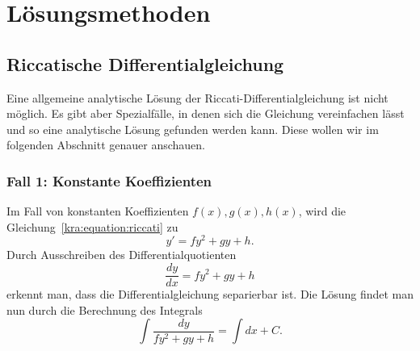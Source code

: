 \section{Lösungsmethoden} \label{kra:section:loesung}

\subsection{Riccatische Differentialgleichung} \label{kra:loesung:riccati}
Eine allgemeine analytische Lösung der Riccati-Differentialgleichung
ist nicht möglich.
Es gibt aber Spezialfälle, in denen sich die Gleichung vereinfachen
lässt und so eine analytische Lösung gefunden werden kann.
Diese wollen wir im folgenden Abschnitt genauer anschauen.

\subsubsection{Fall 1: Konstante Koeffizienten}
Im Fall von konstanten Koeffizienten $f(x), g(x), h(x)$, wird die
Gleichung~\eqref{kra:equation:riccati} zu
\begin{equation}
    y' = fy^2 + gy + h.
\end{equation}
Durch Ausschreiben des Differentialquotienten
\begin{equation}
    \frac{dy}{dx} = fy^2 + gy + h
\end{equation}
erkennt man, dass die Differentialgleichung separierbar ist.
Die Lösung findet man nun durch die Berechnung des Integrals
\begin{equation} \label{kra:equation:case1_int}
    \int \frac{dy}{fy^2 + gy + h} = \int dx+C.
\end{equation}


